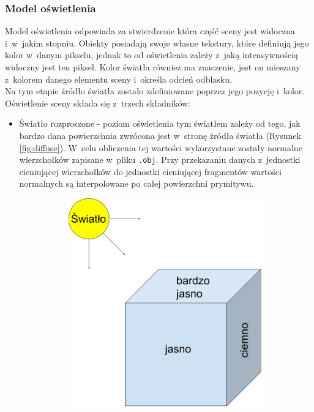 \documentclass[a4paper,twoside,12pt]{book}
\begin{document}
\subsubsection{Model oświetlenia}
Model oświetlenia odpowiada za stwierdzenie która część sceny jest widoczna i~w~jakim stopniu. Obiekty posiadają swoje własne tekstury, które definiują jego kolor w~danym pikselu, jednak to od oświetlenia zależy z~jaką intensywnością widoczny jest ten piksel. Kolor światła również ma znaczenie, jest on mieszany z~kolorem danego elementu sceny i~określa odcień odblasku. \\
Na tym etapie źródło światła zostało zdefiniowane poprzez jego pozycję i~kolor. \\
Oświetlenie sceny składa się z~trzech składników:
\begin{itemize}
    \item Światło rozproszone - poziom oświetlenia tym światłem zależy od tego, jak bardzo dana powierzchnia zwrócona jest w~stronę źródła światła (Rysunek \ref{fig:diffuse}). W~celu obliczenia tej wartości wykorzystane zostały normalne wierzchołków zapisane w~pliku \texttt{.obj}. Przy przekazaniu danych z~jednostki cieniującej wierzchołków do jednostki cieniującej fragmentów wartości normalnych są interpolowane po całej powierzchni prymitywu. \par
    \begin{figure}[H]
        \centering
        \begin{subfigure}[b]{0.4\textwidth}
            \includegraphics[width=\textwidth]{res/diffuse_brightness.png}

\end{subfigure}
\end{figure}
\end{itemize}
\end{document}
